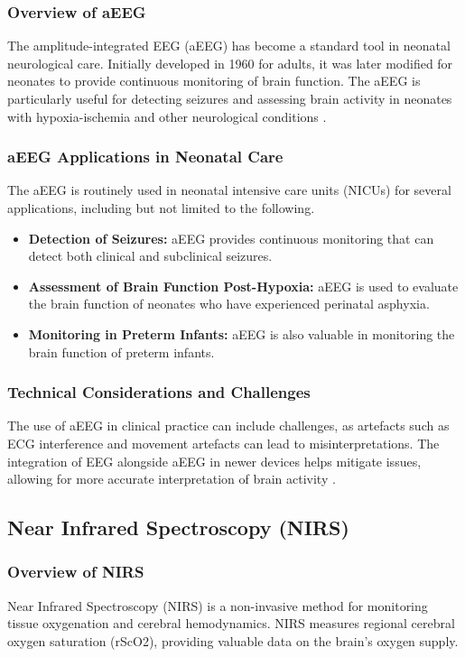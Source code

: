 \documentclass[12pt,journal,compsoc]{IEEEtran}
\begin{document}
\subsubsection{Overview of aEEG}
The amplitude-integrated EEG (aEEG) has become a standard tool in neonatal neurological care. Initially developed in 1960 for adults, it was later modified for neonates to provide continuous monitoring of brain function. The aEEG is particularly useful for detecting seizures and assessing brain activity in neonates with hypoxia-ischemia and other neurological conditions \cite{IEEEhowto:toet}.

\subsubsection{aEEG Applications in Neonatal Care}
The aEEG is routinely used in neonatal intensive care units (NICUs) for several applications, including but not limited to the following. 

\begin{itemize}
    \item \textbf{Detection of Seizures:} aEEG provides continuous monitoring that can detect both clinical and subclinical seizures.
    \item \textbf{Assessment of Brain Function Post-Hypoxia:} aEEG is used to evaluate the brain function of neonates who have experienced perinatal asphyxia.
    \item \textbf{Monitoring in Preterm Infants:} aEEG is also valuable in monitoring the brain function of preterm infants.
\end{itemize}

\subsubsection{Technical Considerations and Challenges}
The use of aEEG in clinical practice can include challenges, as artefacts such as ECG interference and movement artefacts can lead to misinterpretations. The integration of EEG alongside aEEG in newer devices helps mitigate issues, allowing for more accurate interpretation of brain activity \cite{IEEEhowto:toet}.

\subsection{Near Infrared Spectroscopy (NIRS)}

\subsubsection{Overview of NIRS}
Near Infrared Spectroscopy (NIRS) is a non-invasive method for monitoring tissue oxygenation and cerebral hemodynamics. NIRS measures regional cerebral oxygen saturation (rScO2), providing valuable data on the brain's oxygen supply. 
\end{document}
